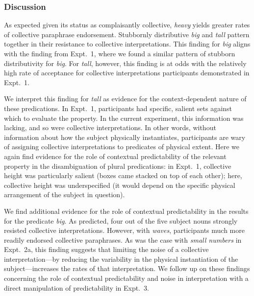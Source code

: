 \documentclass[linguex]{sp}
\begin{document}
\subsubsection{Discussion}

As expected given its status as complaisantly collective, \emph{heavy} yields greater rates of collective paraphrase endorsement. Stubbornly distributive \emph{big} and \emph{tall} pattern together in their resistance to collective interpretations. This finding for \emph{big} aligns with the finding from Expt.~1, where we found a  similar pattern of stubborn distributivity for \emph{big}. For \emph{tall}, however, this finding is at odds with the relatively high rate of acceptance for collective interpretations participants demonstrated in Expt.~1.

We interpret this finding for \emph{tall} as evidence for the context-dependent nature of these predications. In Expt.~1, participants had specific, salient sets against which to evaluate the property. In the current experiment, this information was lacking, and so were collective interpretations. In other words, without information about how the subject physically instantiates, participants are wary of assigning collective interpretations to predicates of physical extent. Here we again find evidence for the role of contextual predictability of the relevant property in the disambiguation of plural predications: in Expt.~1, collective height was particularly salient (boxes came stacked on top of each other); here, collective height was underspecified (it would depend on the specific physical arrangement of the subject in question).

We find additional evidence for the role of contextual predictability in the results for the predicate \emph{big}. As predicted, four out of the five subject nouns strongly resisted collective interpretations. However, with \emph{waves}, participants much more readily endorsed collective paraphrases. As was the case with \emph{small numbers} in Expt.~2a, this finding suggests that limiting the noise of a collective interpretation---by reducing the variability in the physical instantiation of the subject---increases the rates of that interpretation. We follow up on these findings concerning the role of contextual predictability and noise in interpretation with a direct manipulation of predictability in Expt.~3.
\end{document}
